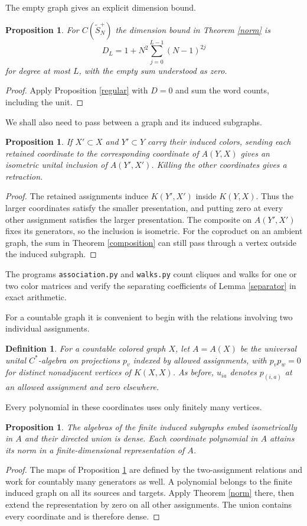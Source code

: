 \documentclass[11pt,a4paper]{article}
\newtheorem{prop}[thm]{Proposition}
\newtheorem{defn}[thm]{Definition}
\begin{document}
The empty graph gives an explicit dimension bound.

\begin{prop}
For $C(\widetilde S_N^+)$ the dimension bound in Theorem \ref{norm} is
\[
 D_L=1+N^2\sum_{j=0}^{L-1}(N-1)^{2j}
\]
for degree at most $L$, with the empty sum understood as zero.
\end{prop}
\begin{proof}
Apply Proposition \ref{regular} with $D=0$ and sum the word counts, including the unit.
\end{proof}

We shall also need to pass between a graph and its induced subgraphs.

\begin{prop}\label{induced}
If $X'\subset X$ and $Y'\subset Y$ carry their induced colors, sending each retained coordinate to the corresponding coordinate of $A(Y,X)$ gives an isometric unital inclusion of $A(Y',X')$. Killing the other coordinates gives a retraction.
\end{prop}
\begin{proof}
The retained assignments induce $K(Y',X')$ inside $K(Y,X)$. Thus the larger coordinates satisfy the smaller presentation, and putting zero at every other assignment satisfies the larger presentation. The composite on $A(Y',X')$ fixes its generators, so the inclusion is isometric. For the coproduct on an ambient graph, the sum in Theorem \ref{composition} can still pass through a vertex outside the induced subgraph.
\end{proof}

The programs \texttt{association.py} and \texttt{walks.py} count cliques and walks for one or two color matrices and verify the separating coefficients of Lemma \ref{separator} in exact arithmetic.

For a countable graph it is convenient to begin with the relations involving two individual assignments.

\begin{defn}
For a countable colored graph $X$, let $A=A(X)$ be the universal unital $C^*$-algebra on projections $p_v$ indexed by allowed assignments, with $p_vp_w=0$ for distinct nonadjacent vertices of $K(X,X)$. As before, $u_{ia}$ denotes $p_{(i,a)}$ at an allowed assignment and zero elsewhere.
\end{defn}

Every polynomial in these coordinates uses only finitely many vertices.

\begin{prop}
The algebras of the finite induced subgraphs embed isometrically in $A$ and their directed union is dense. Each coordinate polynomial in $A$ attains its norm in a finite-dimensional representation of $A$.
\end{prop}
\begin{proof}
The maps of Proposition \ref{induced} are defined by the two-assignment relations and work for countably many generators as well. A polynomial belongs to the finite induced graph on all its sources and targets. Apply Theorem \ref{norm} there, then extend the representation by zero on all other assignments. The union contains every coordinate and is therefore dense.
\end{proof}
\end{document}
